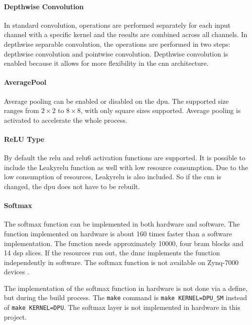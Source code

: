 \paragraph{Depthwise Convolution}
In standard convolution, operations are performed separately for each input channel with a specific kernel and the results are combined across all channels.
In depthwise separable convolution, the operations are performed in two steps: depthwise convolution and pointwise convolution.
Depthwise convolution is enabled because it allows for more flexibility in the \acrshort{cnn} architecture.

\paragraph{AveragePool}
Average pooling can be enabled or disabled on the \acrshort{dpu}.
The supported size ranges from $2\times2$ to $8\times8$, with only square sizes supported.
Average pooling is activated to accelerate the whole process.

\paragraph{ReLU Type}
By default the \acrshort{relu} and \acrshort{relu}6 activation functions are supported.
It is possible to include the Leaky\acrshort{relu} function as well with low resource consumption.
Due to the low consumption of resources, Leaky\acrshort{relu} is also included.
So if the \acrshort{cnn} is changed, the \acrshort{dpu} does not have to be rebuilt.

\paragraph{Softmax}
The softmax function can be implemented in both hardware and software.
The function implemented on hardware is about 160 times faster than a software implementation.
The function needs approximately \SI{10000}{}, four \acrshort{bram} blocks and 14 \acrshort{dsp} slices.
If the resources run out, the \acrlong{dnnc} implements the function independently in software.
The softmax function is not available on Zynq-7000 devices \cite{dpu_product_guide}. 

The implementation of the softmax function in hardware is not done via a define, but during the build process.
The \texttt{make} command is \texttt{make KERNEL=DPU\_SM} instead of \texttt{make KERNEL=DPU}.
The softmax layer is not implemented in hardware in this project.

